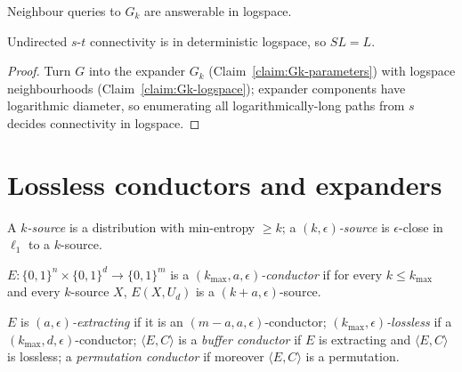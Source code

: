 \begin{claim}
  \label{claim:Gk-logspace}
  \notready
  Neighbour queries to $G_k$ are answerable in logspace.
\end{claim}

\begin{theorem}[Reingold's theorem $SL=L$]
  \label{thm:reingold-sl}
  Undirected $s$-$t$ connectivity is in deterministic logspace, so $SL=L$.
\end{theorem}
\begin{proof}
  Turn $G$ into the expander $G_k$ (Claim~\ref{claim:Gk-parameters}) with
  logspace neighbourhoods (Claim~\ref{claim:Gk-logspace}); expander components
  have logarithmic diameter, so enumerating all logarithmically-long paths from
  $s$ decides connectivity in logspace.
\end{proof}


\chapter{Lossless conductors and expanders}

\begin{definition}[10.1, $k$-source]
  \label{def:k-source}
  A \emph{$k$-source} is a distribution with min-entropy $\ge k$; a
  \emph{$(k,\epsilon)$-source} is $\epsilon$-close in $\ell_1$ to a $k$-source.
\end{definition}

\begin{definition}[10.2, Conductor]
  \label{def:conductor}
  $E:\{0,1\}^n\times\{0,1\}^d\to\{0,1\}^m$ is a
  \emph{$(k_{\max},a,\epsilon)$-conductor} if for every $k\le k_{\max}$ and every
  $k$-source $X$, $E(X,U_d)$ is a $(k+a,\epsilon)$-source.
\end{definition}

\begin{definition}
  \label{def:conductor-types}
  $E$ is \emph{$(a,\epsilon)$-extracting} if it is an
  $(m-a,a,\epsilon)$-conductor; \emph{$(k_{\max},\epsilon)$-lossless} if a
  $(k_{\max},d,\epsilon)$-conductor; $\langle E,C\rangle$ is a \emph{buffer
  conductor} if $E$ is extracting and $\langle E,C\rangle$ is lossless; a
  \emph{permutation conductor} if moreover $\langle E,C\rangle$ is a permutation.
\end{definition}

